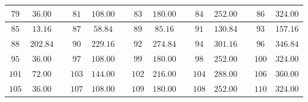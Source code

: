 \begin{table}
\begin{center}
\begin{tabular}{|c|c|c|c|c|c|c|c|c|c|c|c|c|c|}
\hline{} $79$& $36.00$& & $81$&$108.00$& & $83$&$180.00$& & $84$&$252.00$& & $86$&$324.00$\\
\hline{} $85$& $13.16$& & $87$& $58.84$& & $89$& $85.16$& & $91$&$130.84$& & $93$&$157.16$\\
\hline{} $88$&$202.84$& & $90$&$229.16$& & $92$&$274.84$& & $94$&$301.16$& & $96$&$346.84$\\
\hline{} $95$& $36.00$& & $97$&$108.00$& & $99$&$180.00$& & $98$&$252.00$& &$100$&$324.00$\\
\hline{}$101$& $72.00$& &$103$&$144.00$& &$102$&$216.00$& &$104$&$288.00$& &$106$&$360.00$\\
\hline{}$105$& $36.00$& &$107$&$108.00$& &$109$&$180.00$& &$108$&$252.00$& &$110$&$324.00$\\
\hline
\hline
\end{tabular}
\end{center}
\end{table}
